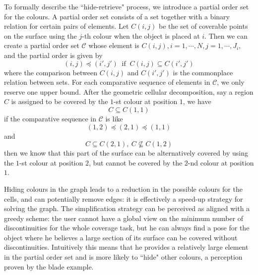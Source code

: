 \documentclass[letterpaper, 10pt, conference]{ieeeconf}
\begin{document}
To formally describe the ``hide-retrieve" process, we introduce a partial order set for the colours. 
A partial order set consists of a set together with a binary relation for certain pairs of elements. 
Let $C(i, j)$ be the set of coverable points on the surface using the $j$-th colour when the object is placed at $i$. Then we can create a partial order set $\mathscr{C}$ whose element is $C(i, j), i = 1, \cdots, N, j = 1, \cdots, J_i$, and the partial order is given by 
\begin{equation}
(i, j)\preceq (i', j') ~\mbox{ if }~ C(i, j)\subseteq C(i', j')
\end{equation}
where the comparison between $C(i, j)$ and $C(i', j')$ is the commonplace relation between sets. 
For each comparative sequence of elements in $\mathscr{C}$, we only reserve one upper bound. 
After the geometric cellular decomposition, say a region $C$ is assigned to be covered by the $1$-st colour at position $1$, we have
\begin{equation}
C\subseteq C(1, 1)
\end{equation}
if the comparative sequence in $\mathscr{C}$ is like
\begin{equation}
(1, 2)\preceq (2, 1)\preceq (1, 1)
\end{equation} 
and 
\begin{equation}
C\subseteq C(2, 1),\ C\nsubseteq C(1, 2)
\end{equation}
then we know that this part of the surface can be alternatively covered by using the $1$-st colour at position $2$, but cannot be covered by the $2$-nd colour at position $1$. 

Hiding colours in the graph leads to a reduction in the possible colours for the cells, and can potentially remove edges: it is effectively a speed-up strategy for solving the graph. The simplification strategy can be perceived as aligned with a greedy scheme: the user cannot have a global view on the minimum number of discontinuities for the whole coverage task, but he can always find a pose for the object where he believes a large section of its surface can be covered without discontinuities. Intuitively this means that he provides a relatively large element in the partial order set and is more likely to ``hide" other colours, a perception proven by the blade example.
\end{document}
